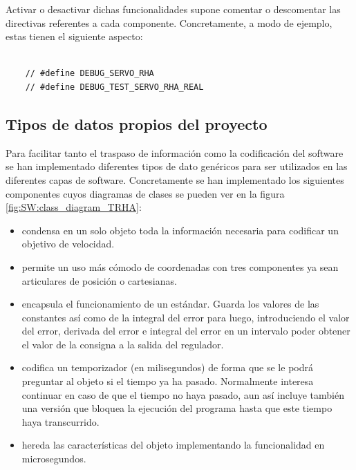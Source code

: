         Activar o desactivar dichas funcionalidades supone comentar o descomentar las directivas referentes a cada componente.  Concretamente, a modo de ejemplo, estas tienen el siguiente aspecto:
        \lstset{language=C, breaklines=true, basicstyle=\footnotesize}
        \begin{lstlisting}[frame=single]

    // #define DEBUG_SERVO_RHA
    // #define DEBUG_TEST_SERVO_RHA_REAL

        \end{lstlisting}
    \subsection{Tipos de datos propios del proyecto} \label{subsec:SW:rhatypes}
        Para facilitar tanto el traspaso de información como la codificación del software se han implementado diferentes tipos de dato genéricos para ser utilizados en las diferentes capas de software. Concretamente se han implementado los siguientes componentes cuyos diagramas de clases se pueden ver en la figura \ref{fig:SW:class_diagram_TRHA}:

        \begin{itemize}
            \item {} condensa en un solo objeto toda la información necesaria para co\-dificar un objetivo de velocidad.
            \item {} permite un uso más cómodo de coordenadas con tres componentes ya sean articulares de posición o cartesianas.
            \item {} encapsula el funcionamiento de un  estándar. Guarda los valores de las constantes así como de la integral del error para luego, introduciendo el valor del error, derivada del error e integral del error en un intervalo poder obtener el valor de la consigna a la salida del regulador.
            \item {} codifica un temporizador (en milisegundos) de forma que se le podrá preguntar al objeto si el tiempo ya ha pasado. Normalmente interesa continuar en caso de que el tiempo no haya pasado, aun así incluye también una versión que bloquea la ejecución del programa hasta que este tiempo haya transcurrido.
            \item {} hereda las características del objeto  implementando la funcionalidad en microsegundos.
        \end{itemize}

